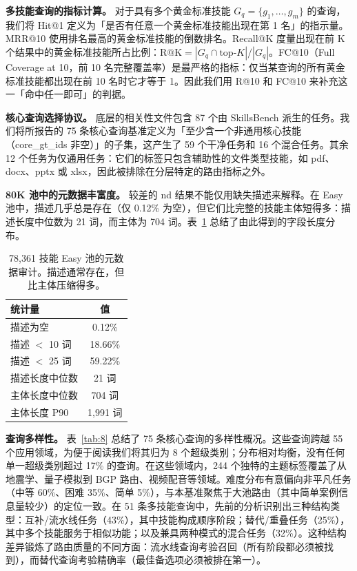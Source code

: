 \documentclass[11pt,UTF8,fontset=fandol]{ctexart}
\makeatletter
\newcommand{\Hit}{Hit@1}
\makeatother
\begin{document}
\textbf{多技能查询的指标计算。} 对于具有多个黄金标准技能 $G_q = \{g_1, \dots, g_m\}$ 的查询，我们将 \Hit{} 定义为「是否有任意一个黄金标准技能出现在第 1 名」的指示量。MRR@10 使用排名最高的黄金标准技能的倒数排名。Recall@K 度量出现在前 K 个结果中的黄金标准技能所占比例：$\mathrm{R@K} = |G_q \cap \text{top-}K| / |G_q|$。FC@10（Full Coverage at 10，前 10 名完整覆盖率）是最严格的指标：仅当某查询的所有黄金标准技能都出现在前 10 名时它才等于 1。因此我们用 R@10 和 FC@10 来补充这一「命中任一即可」的判据。

\textbf{核心查询选择协议。} 底层的相关性文件包含 87 个由 SkillsBench 派生的任务。我们将所报告的 75 条核心查询基准定义为「至少含一个非通用核心技能（core\_gt\_ids 非空）」的子集，这产生了 59 个干净任务和 16 个混合任务。其余 12 个任务为仅通用任务：它们的标签只包含辅助性的文件类型技能，如 pdf、docx、pptx 或 xlsx，因此被排除在分层特定的路由指标之外。

\textbf{80K 池中的元数据丰富度。} 较差的 nd 结果不能仅用缺失描述来解释。在 Easy 池中，描述几乎总是存在（仅 0.12\% 为空），但它们比完整的技能主体短得多：描述长度中位数为 21 词，而主体为 704 词。表~\ref{tab:7} 总结了由此得到的字段长度分布。

\begin{table}[H]\centering
\caption{78,361 技能 Easy 池的元数据审计。描述通常存在，但比主体压缩得多。}
\begin{tabular}{lc}
\toprule
统计量 & 值 \\ \midrule
描述为空 & 0.12\% \\
描述 $<$ 10 词 & 18.66\% \\
描述 $<$ 25 词 & 59.22\% \\
描述长度中位数 & 21 词 \\
主体长度中位数 & 704 词 \\
主体长度 P90 & 1,991 词 \\
\bottomrule
\end{tabular}
\label{tab:7}
\end{table}

\textbf{查询多样性。} 表~\ref{tab:8} 总结了 75 条核心查询的多样性概况。这些查询跨越 55 个应用领域，为便于阅读我们将其归为 8 个超级类别；分布相对均衡，没有任何单一超级类别超过 17\% 的查询。在这些领域内，244 个独特的主题标签覆盖了从地震学、量子模拟到 BGP 路由、视频配音等领域。难度分布有意偏向非平凡任务（中等 60\%、困难 35\%、简单 5\%），与本基准聚焦于大池路由（其中简单案例信息量较少）的定位一致。在 51 条多技能查询中，先前的分析识别出三种结构类型：互补/流水线任务（43\%），其中技能构成顺序阶段；替代/重叠任务（25\%），其中多个技能服务于相似功能；以及兼具两种模式的混合任务（32\%）。这种结构差异锻炼了路由质量的不同方面：流水线查询考验召回（所有阶段都必须被找到），而替代查询考验精确率（最佳备选项必须被排在第一）。
\end{document}

